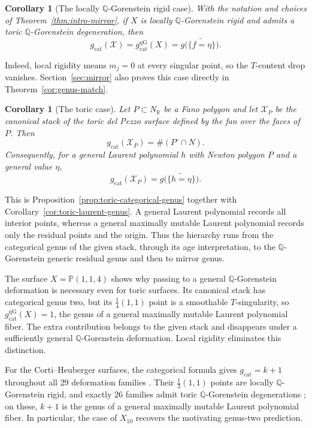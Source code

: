\documentclass[11pt]{article}
\theoremstyle{plain}
\newtheorem{corollary}[theorem]{Corollary}
\theoremstyle{definition}
\theoremstyle{remark}
\newcommand{\cX}{\mathcal X}
\newcommand{\Q}{\mathbb Q}
\newcommand{\Pj}{\mathbb P}
\newcommand{\1}{\mathbf 1}
\begin{document}
\begin{corollary}[The locally $\Q$-Gorenstein rigid case]\label{cor:intro-rigid}
With the notation and choices of Theorem~\ref{thm:intro-mirror}, if $X$ is locally $\Q$-Gorenstein rigid and admits a toric $\Q$-Gorenstein degeneration, then
\[
g_{\mathrm{cat}}(\cX)
=g_{\mathrm{cat}}^{\mathrm{qG}}(X)
=g\bigl(\widetilde{\{f=\eta\}}\bigr).
\]
\end{corollary}

Indeed, local rigidity means $m_j=0$ at every singular point, so the $T$-content drop vanishes.  Section~\ref{sec:mirror} also proves this case directly in Theorem~\ref{cor:genus-match}.

\begin{corollary}[The toric case]\label{cor:intro-toric}
Let $P\subset N_{\mathbb R}$ be a Fano polygon and let $\mathcal X_P$ be the canonical stack of the toric del Pezzo surface defined by the fan over the faces of $P$.  Then
\[
g_{\mathrm{cat}}(\mathcal X_P)=\#(P^\circ\cap N).
\]
Consequently, for a general Laurent polynomial $h$ with Newton polygon $P$ and a general value $\eta$,
\[
g_{\mathrm{cat}}(\mathcal X_P)=g\bigl(\widetilde{\{h=\eta\}}\bigr).
\]
\end{corollary}

This is Proposition~\ref{prop:toric-categorical-genus} together with Corollary~\ref{cor:toric-laurent-genus}.  A general Laurent polynomial records all interior points, whereas a general maximally mutable Laurent polynomial records only the residual points and the origin.  Thus the hierarchy runs from the categorical genus of the given stack, through its age interpretation, to the $\Q$-Gorenstein generic residual genus and then to mirror genus.

The surface $X=\Pj(1,1,4)$ shows why passing to a general $\Q$-Gorenstein deformation is necessary even for toric surfaces.  Its canonical stack has categorical genus two, but its $\frac14(1,1)$ point is a smoothable $T$-singularity, so $g_{\mathrm{cat}}^{\mathrm{qG}}(X)=1$, the genus of a general maximally mutable Laurent polynomial fiber.  The extra contribution belongs to the given stack and disappears under a sufficiently general $\Q$-Gorenstein deformation.  Local rigidity eliminates this distinction.

For the Corti--Heuberger surfaces, the categorical formula gives $g_{\mathrm{cat}}=k+1$ throughout all $29$ deformation families \cite{CH}.  Their $\frac13(1,1)$ points are locally $\Q$-Gorenstein rigid, and exactly $26$ families admit toric $\Q$-Gorenstein degenerations \cite[Theorem 8]{ACC+}; on these, $k+1$ is the genus of a general maximally mutable Laurent polynomial fiber.  In particular, the case of $X_{10}$ recovers the motivating genus-two prediction.
\end{document}

